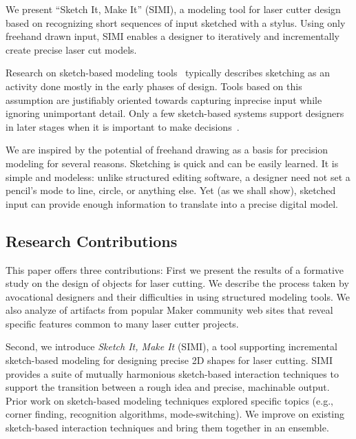\documentclass{article}
\begin{document}
We present ``Sketch It, Make It'' (SIMI), a modeling tool for laser
cutter design based on recognizing short sequences of input sketched
with a stylus. Using only freehand drawn input, SIMI enables a
designer to iteratively and incrementally create precise laser cut
models.

Research on sketch-based modeling tools~\cite{johnson-sketch-review}
typically describes sketching as an activity done mostly in the early
phases of design. Tools based on this assumption are justifiably
oriented towards capturing inprecise input while ignoring unimportant
detail. Only a few sketch-based systems support designers in later
stages when it is important to make
decisions~\cite{mori-plushie,saul-sketch-chair,naya-parsketch}.


We are inspired by the potential of freehand drawing as a basis for
precision modeling for several reasons. Sketching is quick and can be
easily learned. It is simple and modeless: unlike structured editing
software, a designer need not set a pencil's mode to line, circle, or
anything else. Yet (as we shall show), sketched input can provide
enough information to translate into a precise digital model.

\subsection{Research Contributions}

This paper offers three contributions: First we present the results of
a formative study on the design of objects for laser cutting. We
describe the process taken by avocational designers and their
difficulties in using structured modeling tools. We also analyze of
artifacts from popular Maker community web sites that reveal specific
features common to many laser cutter projects.

Second, we introduce \textit{Sketch It, Make It} (SIMI), a tool
supporting incremental sketch-based modeling for designing precise 2D
shapes for laser cutting. SIMI provides a suite of mutually harmonious
sketch-based interaction techniques to support the transition between
a rough idea and precise, machinable output. Prior work on
sketch-based modeling techniques explored specific topics (e.g.,
corner finding, recognition algorithms, mode-switching). We improve on
existing sketch-based interaction techniques and bring them together
in an ensemble.
\end{document}
